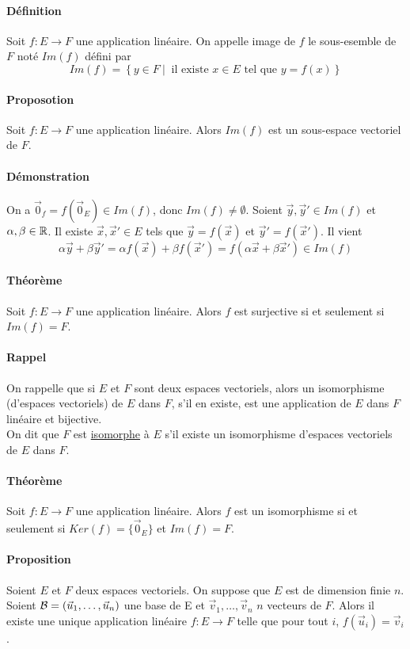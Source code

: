 \paragraph{Définition} Soit $f: E \rightarrow F$ une application linéaire. On appelle image de $f$ le sous-esemble de $F$ noté $Im(f)$ défini par
$$Im(f) = \left\{ y \in F ~ \vert ~ \text{ il existe } x \in E \text{ tel que } y = f(x) \right\}$$

\paragraph{Proposotion} Soit $f: E \rightarrow F$ une application linéaire. Alors $Im(f)$ est un sous-espace vectoriel de $F$.
\paragraph{Démonstration} On a $\vec{0}_f = f(\vec{0}_E) \in Im(f)$, donc $Im(f) \neq \emptyset$. Soient $\vec{y}, \vec{y}' \in Im(f)$ et $\alpha, \beta \in \mathbb{R}$. Il existe $\vec{x}, \vec{x}' \in E$ tels que $\vec{y} = f(\vec{x})$ et $\vec{y}' = f(\vec{x}')$. Il vient
$$\alpha \vec{y} + \beta \vec{y}' = \alpha f(\vec{x}) + \beta f(\vec{x}') = f(\alpha \vec{x} + \beta \vec{x}') \in Im(f)$$

\paragraph{Théorème} Soit $f: E \rightarrow F$  une application linéaire. Alors $f$ est surjective si et seulement si $Im(f) = F$.

\paragraph{Rappel} On rappelle que si $E$ et $F$ sont deux espaces vectoriels, alors un isomorphisme (d'espaces vectoriels) de $E$ dans $F$, s'il en existe, est une application de $E$ dans $F$ linéaire et bijective. \\
On dit que $F$ est \underline{isomorphe} à $E$ s'il existe un isomorphisme d'espaces vectoriels de $E$ dans $F$.

\paragraph{Théorème} Soit $f: E \rightarrow F$  une application linéaire. Alors $f$ est un isomorphisme si et seulement si $Ker(f) = \{\vec{0}_E\}$ et $Im(f) = F$.

\paragraph{Proposition} Soient $E$ et $F$ deux espaces vectoriels. On suppose que $E$ est de dimension finie $n$. Soient $\mathcal{B} = (\vec{u}_1, \ldots, \vec{u}_n)$ une base de E et $\vec{v}_1, \ldots, \vec{v}_n$ $n$ vecteurs de $F$. Alors il existe une unique application linéaire $f: E \rightarrow F$ telle que pour tout $i$, $f(\vec{u}_i) = \vec{v}_i$.

